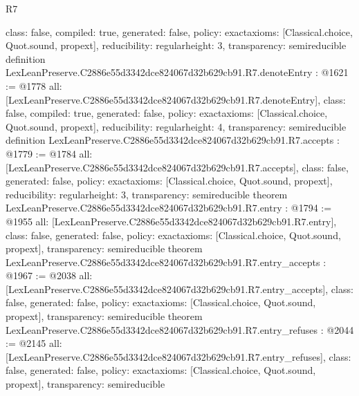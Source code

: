 \begin{lexlean}{R7}
\begin{coremodule}
{  class: false,
  compiled: true,
  generated: false,
  policy: exact{axioms: [Classical.choice, Quot.sound, propext]},
  reducibility: regular{height: 3},
  transparency: semireducible
}
definition LexLeanPreserve.C2886e55d3342dce824067d32b629cb91.R7.denoteEntry : @1621 := @1778 {
  all: [LexLeanPreserve.C2886e55d3342dce824067d32b629cb91.R7.denoteEntry],
  class: false,
  compiled: true,
  generated: false,
  policy: exact{axioms: [Classical.choice, Quot.sound, propext]},
  reducibility: regular{height: 4},
  transparency: semireducible
}
definition LexLeanPreserve.C2886e55d3342dce824067d32b629cb91.R7.accepts : @1779 := @1784 {
  all: [LexLeanPreserve.C2886e55d3342dce824067d32b629cb91.R7.accepts],
  class: false,
  generated: false,
  policy: exact{axioms: [Classical.choice, Quot.sound, propext]},
  reducibility: regular{height: 3},
  transparency: semireducible
}
theorem LexLeanPreserve.C2886e55d3342dce824067d32b629cb91.R7.entry : @1794 := @1955 {
  all: [LexLeanPreserve.C2886e55d3342dce824067d32b629cb91.R7.entry],
  class: false,
  generated: false,
  policy: exact{axioms: [Classical.choice, Quot.sound, propext]},
  transparency: semireducible
}
theorem LexLeanPreserve.C2886e55d3342dce824067d32b629cb91.R7.entry_accepts : @1967 := @2038 {
  all: [LexLeanPreserve.C2886e55d3342dce824067d32b629cb91.R7.entry_accepts],
  class: false,
  generated: false,
  policy: exact{axioms: [Classical.choice, Quot.sound, propext]},
  transparency: semireducible
}
theorem LexLeanPreserve.C2886e55d3342dce824067d32b629cb91.R7.entry_refuses : @2044 := @2145 {
  all: [LexLeanPreserve.C2886e55d3342dce824067d32b629cb91.R7.entry_refuses],
  class: false,
  generated: false,
  policy: exact{axioms: [Classical.choice, Quot.sound, propext]},
  transparency: semireducible
}


\end{coremodule}
\end{lexlean}
